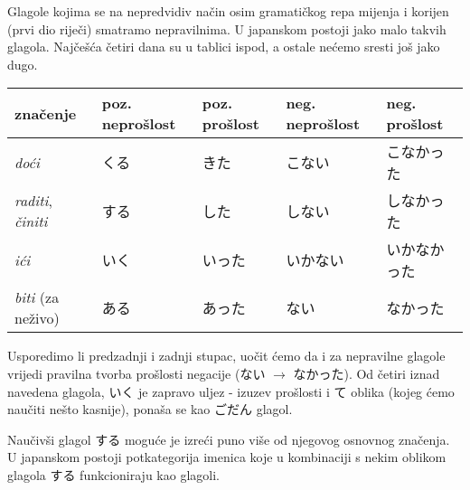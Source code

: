 \newpage
{}

	
	
	Glagole kojima se na nepredvidiv način osim gramatičkog repa mijenja i korijen (prvi dio riječi) smatramo nepravilnima. U japanskom postoji jako malo takvih glagola. Najčešća četiri dana su u tablici ispod, a ostale nećemo sresti još jako dugo.
	
	\begin{table}[h]
		\centering
		\begin{tabular}{l l l l l}\toprule[2pt]
			značenje & poz. neprošlost & poz. prošlost & neg. neprošlost & neg. prošlost\\
			\midrule
			\textit{doći} & くる & きた & こない & こなかった\\
			\textit{raditi}, \textit{činiti} & する & した & しない & しなかった\\
			\textit{ići} & いく & いった & いかない & いかなかった\\
			\textit{biti} (za neživo) & ある & あった & ない & なかった\\
			\bottomrule[2pt]
		\end{tabular}
	\end{table}

	Usporedimo li predzadnji i zadnji stupac, uočit ćemo da i za nepravilne glagole vrijedi pravilna tvorba prošlosti negacije (ない $\rightarrow$ なかった). Od četiri iznad navedena glagola, いく je zapravo uljez - izuzev prošlosti i て oblika (kojeg ćemo naučiti nešto kasnije), ponaša se kao ごだん glagol.
	
	
	Naučivši glagol する moguće je izreći puno više od njegovog osnovnog značenja. U japanskom postoji potkategorija imenica koje u kombinaciji s nekim oblikom glagola する funkcioniraju kao glagoli.
	
	\begin{reibun}
	\end{reibun}
	
